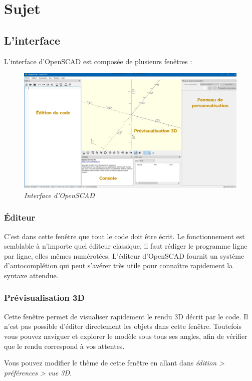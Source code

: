 \section{Sujet}

\subsection{L'interface}

L'interface d'OpenSCAD est composée de plusieurs fenêtres :


\begin{figure}[ht]
	\centering
	\includegraphics[width=12cm]{images/interface}
	\caption{\textit{Interface d'OpenSCAD}}
\end{figure}


\subsubsection{Éditeur}

C'est dans cette fenêtre que tout le code doit être écrit.
Le fonctionnement est semblable à n'importe quel éditeur classique, il faut rédiger le programme ligne par ligne, elles mêmes numérotées.
L'éditeur d'OpenSCAD fournit un système d'autocomplétion qui peut s'avérer très utile pour connaître rapidement la syntaxe attendue.


\subsubsection{Prévisualisation 3D}

Cette fenêtre permet de visualiser rapidement le rendu 3D décrit par le code.
Il n'est pas possible d'éditer directement les objets dans cette fenêtre.
Toutefois vous pouvez naviguer et explorer le modèle sous tous ses angles, afin de vérifier que le rendu correspond à vos attentes.

Vous pouvez modifier le thème de cette fenêtre en allant dans \textit{édition > préférences > vue 3D}.

